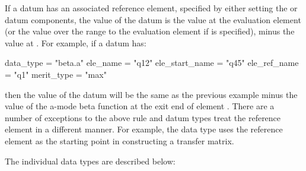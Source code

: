 If a datum has an associated reference element, specified by either
setting the  or  datum components, the
 value of the datum is the value at the evaluation element (or the value
over the range  to the evaluation element if  is
specified), minus the  value at . For example,
if a datum has:
\begin{example}
  data_type      = "beta.a"
  ele_name       = "q12"
  ele_start_name = "q45"
  ele_ref_name   = "q1"
  merit_type     = "max"
\end{example}
then the  value of the datum will be the same as the
previous example minus the value of the a-mode beta function at the
exit end of element . There are a number of exceptions to the
above rule and datum types treat the reference element in a different
manner. For example, the  data type uses the reference element
as the starting point in constructing a transfer matrix.

The individual data types are described below:

